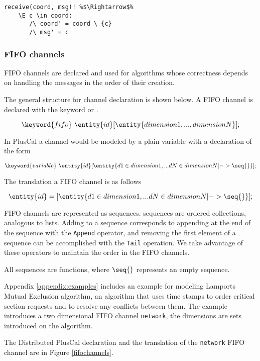 \begin{lstlisting}[frame = none, numbers = none, escapechar=\%]
receive(coord, msg)! %$\Rightarrow$%
    \E c \in coord:
	   /\ coord' = coord \ {c}
	   /\ msg' = c
\end{lstlisting}


\subsubsection{FIFO channels}

FIFO channels are declared and used for algorithms whose correctness depends on handling the messages in the order of their creation.

The general structure for channel declaration is shown below. A FIFO channel is declared with the keyword  or . 

\[
 \keyword{fifo}\ \entity{id}[\entity{dimension1,...,dimensionN}];
\]

In PlusCal a channel would be modeled by a plain variable with a declaration of the form

\[
 \keyword{variable}\ \entity{id}[\entity{d1 \in dimension1,... dN \in dimensionN |-> \seq{}}];
\]

The \tlaplus translation a FIFO channel is as follows

\[
 \entity{id} = [\entity{d1 \in dimension1,... dN \in dimensionN |-> \seq{}}];
\]


FIFO channels are represented as \tlaplus sequences.
\tlaplus sequences are ordered collections, analogous to lists. Adding to a sequence corresponds to appending at the end of the sequence with the \verb|Append| operator, and removing the first element of a sequence can be accomplished with the \verb|Tail| operation. We take advantage of these operators to maintain the order in the FIFO channels.

All sequences are \tlaplus functions, where $\seq{}$ represents an empty sequence.

Appendix \ref{appendix:examples} includes an example for modeling Lamports Mutual Exclusion algorithm, an algorithm that uses time stamps to order critical section requests and to resolve any conflicts between them. The example introduces a two dimensional FIFO channel \verb|network|, the dimensions are sets introduced on the algorithm.

The Distributed PlusCal declaration and the \tlaplus translation of the \verb|network| FIFO channel are in Figure \ref{fifochannels}.
 

